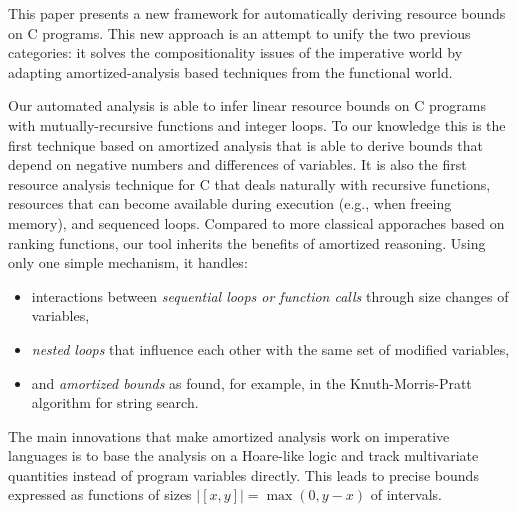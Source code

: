 \documentclass[nocopyrightspace,preprint]{sigplanconf}
\newcommand{\ifshort}[2]{\ifx\fullversion\undefined{#1}\else{#2}\fi}
\newcommand{\itemskipIn}[0]{\ifshort{\vspace{-1pt}}{}}
\begin{document}
This paper presents a new framework for automatically
deriving resource bounds on C programs.  This new
approach is an attempt to unify the two previous
categories: it solves the compositionality issues of the
imperative world by adapting amortized-analysis based
techniques from the functional world.

Our automated analysis is able to infer linear
resource bounds on C programs with mutually-recursive functions and integer loops.
To our knowledge this is the first technique based on
amortized analysis that is able to derive bounds that depend on negative numbers
and differences of variables.  It is also the first
resource analysis technique for C that deals naturally with
recursive functions, resources that can become available during execution (e.g., when freeing
memory), and sequenced loops.  Compared to more classical
apporaches based on ranking functions, our tool inherits
the benefits of amortized reasoning.  Using only one
simple mechanism, it handles:

\begin{itemize}
\item interactions between \emph{sequential loops or
  function calls} through size changes of variables,
\itemskipIn
\item \emph{nested loops} that influence each other
  with the same set of modified variables,
\itemskipIn
\item and \emph{amortized bounds} as found, for example, in
  the Knuth-Morris-Pratt algorithm for string search.
\end{itemize}

The main innovations that make amortized analysis work
on imperative languages is to base the analysis on a
Hoare-like logic and track multivariate quantities instead
of program variables directly.  This leads to precise bounds
expressed as functions of sizes $|[x, y]| = \max(0, y-x)$ of
intervals.


\end{document}
